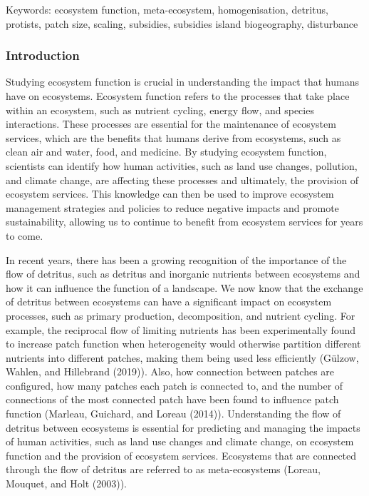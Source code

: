 \documentclass[
]{article}
\begin{document}
Keywords: ecosystem function, meta-ecosystem, homogenisation, detritus,
protists, patch size, scaling, subsidies, subsidies island biogeography,
disturbance

\hypertarget{introduction}{%
\subsubsection{Introduction}\label{introduction}}

Studying ecosystem function is crucial in understanding the impact that
humans have on ecosystems. Ecosystem function refers to the processes
that take place within an ecosystem, such as nutrient cycling, energy
flow, and species interactions. These processes are essential for the
maintenance of ecosystem services, which are the benefits that humans
derive from ecosystems, such as clean air and water, food, and medicine.
By studying ecosystem function, scientists can identify how human
activities, such as land use changes, pollution, and climate change, are
affecting these processes and ultimately, the provision of ecosystem
services. This knowledge can then be used to improve ecosystem
management strategies and policies to reduce negative impacts and
promote sustainability, allowing us to continue to benefit from
ecosystem services for years to come.

In recent years, there has been a growing recognition of the importance
of the flow of detritus, such as detritus and inorganic nutrients
between ecosystems and how it can influence the function of a landscape.
We now know that the exchange of detritus between ecosystems can have a
significant impact on ecosystem processes, such as primary production,
decomposition, and nutrient cycling. For example, the reciprocal flow of
limiting nutrients has been experimentally found to increase patch
function when heterogeneity would otherwise partition different
nutrients into different patches, making them being used less
efficiently (Gülzow, Wahlen, and Hillebrand (2019)). Also, how
connection between patches are configured, how many patches each patch
is connected to, and the number of connections of the most connected
patch have been found to influence patch function (Marleau, Guichard,
and Loreau (2014)). Understanding the flow of detritus between
ecosystems is essential for predicting and managing the impacts of human
activities, such as land use changes and climate change, on ecosystem
function and the provision of ecosystem services. Ecosystems that are
connected through the flow of detritus are referred to as
meta-ecosystems (Loreau, Mouquet, and Holt (2003)).
\end{document}
